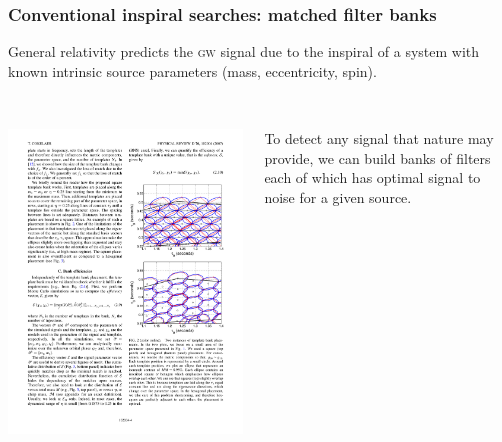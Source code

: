 \documentclass{beamer}
\begin{document}
\section[Method]{}

\begin{frame}
	\frametitle{Conventional inspiral searches: matched filter banks}
	General relativity predicts the \textsc{gw} signal due to the inspiral of a system with known intrinsic source parameters (mass, eccentricity, spin).
	\\~\\

	\begin{columns}
		\begin{column}{0.5\textwidth}
			\includegraphics[width=\textwidth]{figures/hexgrid}
		\end{column}
		\begin{column}{0.5\textwidth}
			To detect any signal that nature may provide, we can build banks of filters each of which has optimal signal to noise for a given source. \\~\\


\end{column}
\end{columns}
\end{frame}
\end{document}
